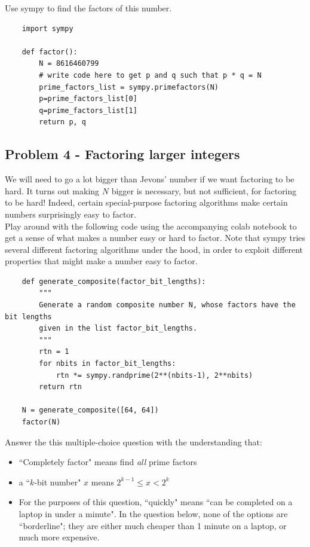 Use sympy to find the factors of this number.
\begin{lstlisting}
    import sympy

    def factor():
        N = 8616460799
        # write code here to get p and q such that p * q = N
        prime_factors_list = sympy.primefactors(N)
        p=prime_factors_list[0]
        q=prime_factors_list[1]
        return p, q

\end{lstlisting}


\newpage
\subsection{Problem 4 - Factoring larger integers}
We will need to go a lot bigger than Jevons' number if we want factoring to be hard. It turns out making $N$ bigger is necessary, but not sufficient, for factoring to be hard! Indeed, certain special-purpose factoring algorithms make certain numbers surprisingly easy to factor. \\

Play around with the following code using the accompanying colab notebook to get a sense of what makes a number easy or hard to factor. Note that sympy tries several different factoring algorithms under the hood, in order to exploit different properties that might make a number easy to factor.\\ 

\begin{lstlisting}
    def generate_composite(factor_bit_lengths):
    	"""
    	Generate a random composite number N, whose factors have the bit lengths
    	given in the list factor_bit_lengths.
    	"""
    	rtn = 1
    	for nbits in factor_bit_lengths:
    		rtn *= sympy.randprime(2**(nbits-1), 2**nbits)
    	return rtn
      
    N = generate_composite([64, 64])
    factor(N)
\end{lstlisting}

Answer the this multiple-choice question with the understanding that:
\begin{itemize}
    \item ``Completely factor" means find \textit{all} prime factors
    \item  a ``$k$-bit number" $x$ means $2^{k-1}\leq x < 2^k$
    \item For the purposes of this question, ``quickly" means ``can be completed on a laptop in under a minute". In the question below, none of the options are ``borderline"; they are either much cheaper than 1 minute on a laptop, or much more expensive.
\end{itemize}

